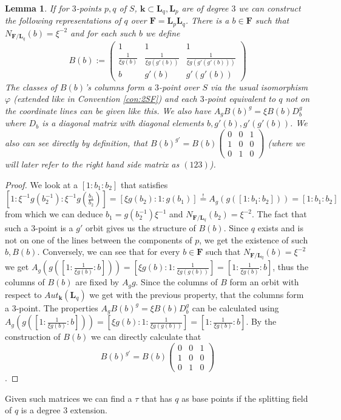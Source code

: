 \documentclass[12pt, oneside, reqno]{amsart}
\newtheorem{lemma}[theorem]{Lemma}
\begin{document}
\begin{lemma} \label{3-pointNonEq}
    If for $3$-points $p, q$ of $S$, $\textbf{k} \subset \textbf{L}_q, \textbf{L}_p$ are of degree $3$ we can construct the following representations of $q$ over $\textbf{F} = \textbf{L}_p \textbf{L}_q$. There is a $b \in \textbf{F}$ such that $N_{\textbf{F} / \textbf{L}_q}(b) = \xi^{-2}$ and for each such $b$ we define  
    \[B(b) := \begin{pmatrix}
        1 & 1 & 1 \\
        \frac{1}{\xi g(b)} & \frac{1}{\xi g(g'(b))} & \frac{1}{\xi g(g'(g'(b)))} \\
        b & g'(b) & g'(g'(b))
    \end{pmatrix}\] The classes of $B(b)$'s columns form a $3$-point over $S$ via the usual isomorphism $\varphi$ (extended like in Convention \ref{con:2SF}) and each $3$-point equivalent to $q$ not on the coordinate lines can be given like this. We also have $A_gB(b)^g = \xi B(b) D_b^g$ where $D_b$ is a diagonal matrix with diagonal elements $b, g'(b),g'(g'(b))$. We also can see directly by definition, that $B(b)^{g'} = B(b) \begin{pmatrix}
        0 & 0 & 1 \\
        1 & 0 & 0 \\
        0 & 1 & 0
    \end{pmatrix}$ (where we will later refer to the right hand side matrix as $(123)$). 
\end{lemma}
\begin{proof}
    We look at a $[1:b_1:b_2]$ that satisfies $[1:\xi^{-1}g(b_2^{-1}): \xi^{-1}g(\frac{b_1}{b_2})] = [\xi g(b_2):1:g(b_1)] \stackrel{!}{=} A_g(g([1:b_1:b_2])) = [1:b_1:b_2]$ from which we can deduce $b_1 = g(b_2^{-1})\xi^{-1}$ and $N_{\textbf{F}/\textbf{L}_q}(b_2) = \xi^{-2} $. The fact that such a $3$-point is a $g'$ orbit gives us the structure of $B(b)$. Since $q$ exists and is not on one of the lines between the components of $p$, we get the existence of such $b, B(b)$. Conversely, we can see that for every $b \in \textbf{F}$ such that $N_{\textbf{F} / \textbf{L}_q}(b) = \xi^{-2}$ we get $A_g(g([1:\frac{1}{\xi g(b)}:b])) = [\xi g(b):1:\frac{1}{\xi g(g(b))}] = [1:\frac{1}{\xi g(b)}: b]$, thus the columns of $B(b)$ are fixed by $A_g g$. Since the columns of $B$ form an orbit with respect to $Aut_{\textbf{k}}(\textbf{L}_q)$ we get with the previous property, that the columns form a $3$-point. The properties $A_gB(b)^g = \xi B(b) D_b^g$ can be calculated using $A_g(g([1:\frac{1}{\xi g(b)}:b])) = [\xi g(b):1:\frac{1}{\xi g(g(b))}] = [1:\frac{1}{\xi g(b)}: b]$. By the construction of $B(b)$ we can directly calculate that \[B(b)^{g'} = B(b) \begin{pmatrix}
        0 & 0 & 1 \\
        1 & 0 & 0 \\
        0 & 1 & 0
    \end{pmatrix}\].
\end{proof}
\noindent
Given such matrices we can find a $\tau$ that has $q$ as base points if the splitting field of $q$ is a degree $3$ extension.
\end{document}
